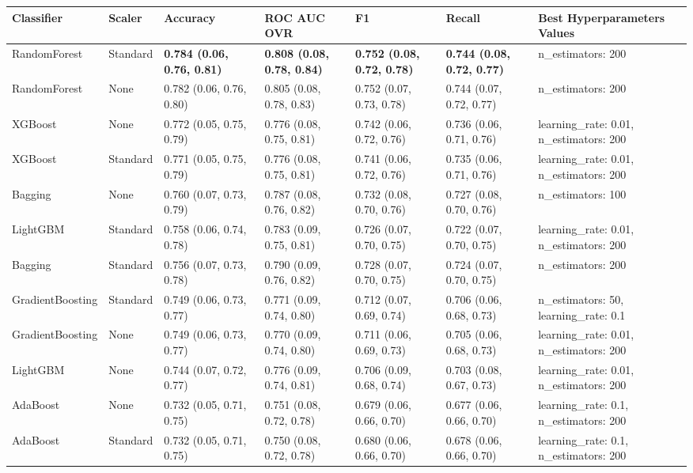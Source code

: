 \begin{tabular}{lllllll}
\toprule
Classifier & Scaler & Accuracy & ROC AUC OVR & F1 & Recall & Best Hyperparameters Values \\
\midrule
RandomForest & Standard & \textbf{0.784 (0.06, 0.76, 0.81)} & \textbf{0.808 (0.08, 0.78, 0.84)} & \textbf{0.752 (0.08, 0.72, 0.78)} & \textbf{0.744 (0.08, 0.72, 0.77)} & {{n\_estimators: 200}} \\
RandomForest & None & 0.782 (0.06, 0.76, 0.80) & 0.805 (0.08, 0.78, 0.83) & 0.752 (0.07, 0.73, 0.78) & 0.744 (0.07, 0.72, 0.77) & {{n\_estimators: 200}} \\
XGBoost & None & 0.772 (0.05, 0.75, 0.79) & 0.776 (0.08, 0.75, 0.81) & 0.742 (0.06, 0.72, 0.76) & 0.736 (0.06, 0.71, 0.76) & {{learning\_rate: 0.01, n\_estimators: 200}} \\
XGBoost & Standard & 0.771 (0.05, 0.75, 0.79) & 0.776 (0.08, 0.75, 0.81) & 0.741 (0.06, 0.72, 0.76) & 0.735 (0.06, 0.71, 0.76) & {{learning\_rate: 0.01, n\_estimators: 200}} \\
Bagging & None & 0.760 (0.07, 0.73, 0.79) & 0.787 (0.08, 0.76, 0.82) & 0.732 (0.08, 0.70, 0.76) & 0.727 (0.08, 0.70, 0.76) & {{n\_estimators: 100}} \\
LightGBM & Standard & 0.758 (0.06, 0.74, 0.78) & 0.783 (0.09, 0.75, 0.81) & 0.726 (0.07, 0.70, 0.75) & 0.722 (0.07, 0.70, 0.75) & {{learning\_rate: 0.01, n\_estimators: 200}} \\
Bagging & Standard & 0.756 (0.07, 0.73, 0.78) & 0.790 (0.09, 0.76, 0.82) & 0.728 (0.07, 0.70, 0.75) & 0.724 (0.07, 0.70, 0.75) & {{n\_estimators: 200}} \\
GradientBoosting & Standard & 0.749 (0.06, 0.73, 0.77) & 0.771 (0.09, 0.74, 0.80) & 0.712 (0.07, 0.69, 0.74) & 0.706 (0.06, 0.68, 0.73) & {{n\_estimators: 50, learning\_rate: 0.1}} \\
GradientBoosting & None & 0.749 (0.06, 0.73, 0.77) & 0.770 (0.09, 0.74, 0.80) & 0.711 (0.06, 0.69, 0.73) & 0.705 (0.06, 0.68, 0.73) & {{learning\_rate: 0.01, n\_estimators: 200}} \\
LightGBM & None & 0.744 (0.07, 0.72, 0.77) & 0.776 (0.09, 0.74, 0.81) & 0.706 (0.09, 0.68, 0.74) & 0.703 (0.08, 0.67, 0.73) & {{learning\_rate: 0.01, n\_estimators: 200}} \\
AdaBoost & None & 0.732 (0.05, 0.71, 0.75) & 0.751 (0.08, 0.72, 0.78) & 0.679 (0.06, 0.66, 0.70) & 0.677 (0.06, 0.66, 0.70) & {{learning\_rate: 0.1, n\_estimators: 200}} \\
AdaBoost & Standard & 0.732 (0.05, 0.71, 0.75) & 0.750 (0.08, 0.72, 0.78) & 0.680 (0.06, 0.66, 0.70) & 0.678 (0.06, 0.66, 0.70) & {{learning\_rate: 0.1, n\_estimators: 200}} \\

\end{tabular}
